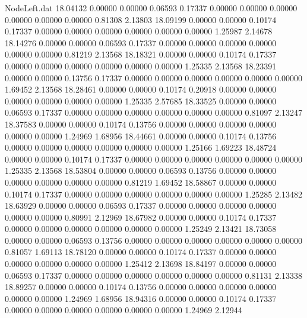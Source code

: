\begin{filecontents}{NodeLeft.dat}
  18.04132    0.00000    0.00000     0.06593    0.17337    0.00000    0.00000    0.00000    0.00000    0.00000    0.00000    0.81308    2.13803
  18.09199    0.00000    0.00000     0.10174    0.17337    0.00000    0.00000    0.00000    0.00000    0.00000    0.00000    1.25987    2.14678
  18.14276    0.00000    0.00000     0.06593    0.17337    0.00000    0.00000    0.00000    0.00000    0.00000    0.00000    0.81219    2.13568
  18.18321    0.00000    0.00000     0.10174    0.17337    0.00000    0.00000    0.00000    0.00000    0.00000    0.00000    1.25335    2.13568
  18.23391    0.00000    0.00000     0.13756    0.17337    0.00000    0.00000    0.00000    0.00000    0.00000    0.00000    1.69452    2.13568
  18.28461    0.00000    0.00000     0.10174    0.20918    0.00000    0.00000    0.00000    0.00000    0.00000    0.00000    1.25335    2.57685
  18.33525    0.00000    0.00000     0.06593    0.17337    0.00000    0.00000    0.00000    0.00000    0.00000    0.00000    0.81097    2.13247
  18.37583    0.00000    0.00000     0.10174    0.13756    0.00000    0.00000    0.00000    0.00000    0.00000    0.00000    1.24969    1.68956
  18.44661    0.00000    0.00000     0.10174    0.13756    0.00000    0.00000    0.00000    0.00000    0.00000    0.00000    1.25166    1.69223
  18.48724    0.00000    0.00000     0.10174    0.17337    0.00000    0.00000    0.00000    0.00000    0.00000    0.00000    1.25335    2.13568
  18.53804    0.00000    0.00000     0.06593    0.13756    0.00000    0.00000    0.00000    0.00000    0.00000    0.00000    0.81219    1.69452
  18.58867    0.00000    0.00000     0.10174    0.17337    0.00000    0.00000    0.00000    0.00000    0.00000    0.00000    1.25285    2.13482
  18.63929    0.00000    0.00000     0.06593    0.17337    0.00000    0.00000    0.00000    0.00000    0.00000    0.00000    0.80991    2.12969
  18.67982    0.00000    0.00000     0.10174    0.17337    0.00000    0.00000    0.00000    0.00000    0.00000    0.00000    1.25249    2.13421
  18.73058    0.00000    0.00000     0.06593    0.13756    0.00000    0.00000    0.00000    0.00000    0.00000    0.00000    0.81057    1.69113
  18.78120    0.00000    0.00000     0.10174    0.17337    0.00000    0.00000    0.00000    0.00000    0.00000    0.00000    1.25412    2.13698
  18.84197    0.00000    0.00000     0.06593    0.17337    0.00000    0.00000    0.00000    0.00000    0.00000    0.00000    0.81131    2.13338
  18.89257    0.00000    0.00000     0.10174    0.13756    0.00000    0.00000    0.00000    0.00000    0.00000    0.00000    1.24969    1.68956
  18.94316    0.00000    0.00000     0.10174    0.17337    0.00000    0.00000    0.00000    0.00000    0.00000    0.00000    1.24969    2.12944

\end{filecontents}
